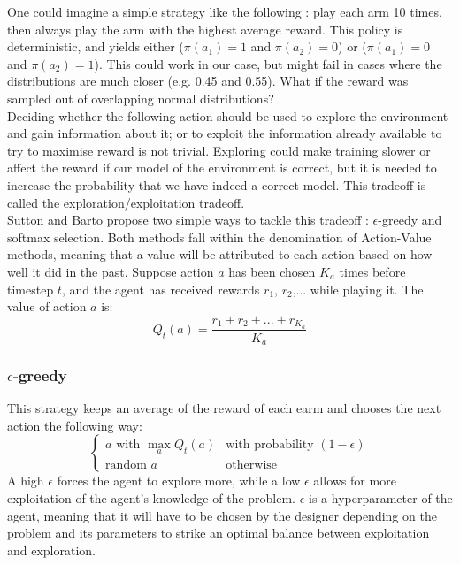 One could imagine a simple strategy like the following : play each arm 10 times,
then always play the arm with the highest average reward. This policy is
deterministic, and yields either ($ \pi(a_1) = 1$ and $\pi(a_2) = 0$) or
($\pi(a_1) = 0$ and $\pi(a_2) = 1$). This could work in
our case, but might fail in cases where the distributions are much closer
(e.g. 0.45 and 0.55). What if the reward was sampled out of overlapping normal
distributions?\\

Deciding whether the following action should be used to explore the environment
and gain information about it; or to exploit the information already available
to try to maximise reward is not trivial. Exploring could make training slower
or affect the reward if our model of the environment is correct, but it is 
needed to increase the probability that we have indeed a correct model. This
tradeoff is called the exploration/exploitation tradeoff. 
\\

Sutton and Barto \cite{suttonbarto} propose two
simple ways to tackle this tradeoff : $\epsilon$-greedy and softmax selection.
Both methods fall within the denomination of Action-Value methods, meaning
that a value will be attributed to each action based on how well it did
in the past. Suppose action $a$ has been chosen $K_a$ times before timestep
$t$, and the agent has received rewards $r_1$, $r_2$,... while playing it. 
The value of action $a$ is:
\begin{equation}
Q_t(a) = \frac{r_1 + r_2 + ... + r_{K_a}}{K_a}
	\label{eq:action-value}
\end{equation}

\subsubsection{$\epsilon$-greedy}
This strategy keeps an average of the reward of each earm and chooses the next
action the following way:
\begin{equation}\begin{cases}
	\text{$a$ with $\max\limits_aQ_t(a)$} & \text{with probability } (1-\epsilon) 
	\\
	\text{random $a$} & \text{otherwise}
\end{cases}
\label{eq:egreedy}
\end{equation}
A high $\epsilon$ forces the agent to explore more, while a low $\epsilon$
allows for more exploitation of the agent's knowledge of the problem. 
$\epsilon$ is a hyperparameter of the agent, meaning that it will have to
be chosen by the designer depending on the problem and its parameters to 
strike an optimal balance between exploitation and exploration.

